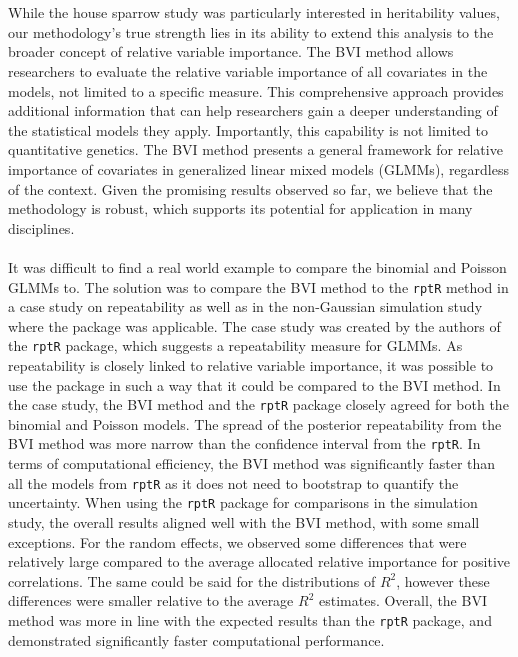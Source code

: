 \\
\\
While the house sparrow study was particularly interested in heritability values, our methodology's true strength lies in its ability to extend this analysis to the broader concept of relative variable importance. The BVI method allows researchers to evaluate the relative variable importance of all covariates in the models, not limited to a specific measure. This comprehensive approach provides additional information that can help researchers gain a deeper understanding of the statistical models they apply. Importantly, this capability is not limited to quantitative genetics. The BVI method presents a general framework for relative importance of covariates in generalized linear mixed models (GLMMs), regardless of the context. Given the promising results observed so far, we believe that the methodology is robust, which supports its potential for application in many disciplines.
\\
\\
It was difficult to find a real world example to compare the binomial and Poisson GLMMs to. The solution was to compare the BVI method to the \texttt{rptR} method in a case study on repeatability as well as in the non-Gaussian simulation study where the package was applicable. The case study was created by the authors of the \texttt{rptR} package, which suggests a repeatability measure for GLMMs. As repeatability is closely linked to relative variable importance, it was possible to use the package in such a way that it could be compared to the BVI method. In the case study, the BVI method and the \texttt{rptR} package closely agreed for both the binomial and Poisson models. The spread of the posterior repeatability from the BVI method was more narrow than the confidence interval from the \texttt{rptR}. In terms of computational efficiency, the BVI method was significantly faster than all the models from \texttt{rptR} as it does not need to bootstrap to quantify the uncertainty. When using the \texttt{rptR} package for comparisons in the simulation study, the overall results aligned well with the BVI method, with some small exceptions. For the random effects, we observed some differences that were relatively large compared to the average allocated relative importance for positive correlations. The same could be said for the distributions of $R^2$, however these differences were smaller relative to the average $R^2$ estimates. Overall, the BVI method was more in line with the expected results than the \texttt{rptR} package, and demonstrated significantly faster computational performance.  

